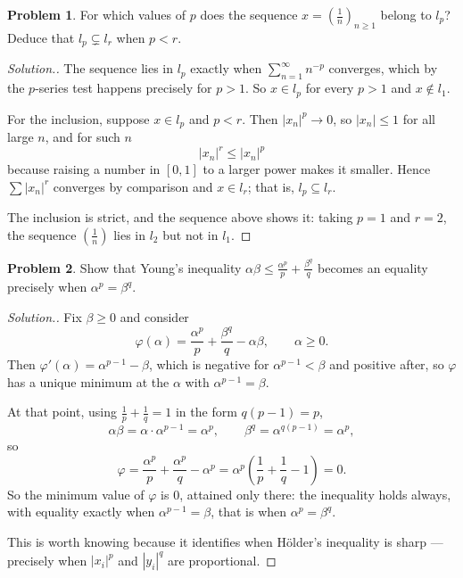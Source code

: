 \documentclass[11pt,a4paper]{article}
\theoremstyle{definition}
\newtheorem{problemx}{Problem}[section]
\newenvironment{problem}{\begin{problemx}}{\end{problemx}}
\newenvironment{solution}
  {\renewcommand{\qedsymbol}{}\begin{proof}[\textit{Solution}.]}
  {\end{proof}}
\begin{document}
\begin{problem}
For which values of $p$ does the sequence $x=\left(\frac{1}{n}\right)_{n\geq 1}$
belong to $l_p$? Deduce that $l_p\subsetneq l_r$ when $p<r$.
\end{problem}
\begin{solution}
The sequence lies in $l_p$ exactly when $\sum_{n=1}^{\infty}n^{-p}$ converges,
which by the $p$-series test happens precisely for $p>1$. So
$x\in l_p$ for every $p>1$ and $x\notin l_1$.

For the inclusion, suppose $x\in l_p$ and $p<r$. Then $|x_n|^p\rightarrow 0$, so
$|x_n|\leq 1$ for all large $n$, and for such $n$
$$|x_n|^r\leq |x_n|^p$$
because raising a number in $[0,1]$ to a larger power makes it smaller. Hence
$\sum|x_n|^r$ converges by comparison and $x\in l_r$; that is,
$l_p\subseteq l_r$.

The inclusion is strict, and the sequence above shows it: taking $p=1$ and
$r=2$, the sequence $\left(\frac1n\right)$ lies in $l_2$ but not in $l_1$.
\end{solution}

\begin{problem}
Show that Young's inequality $\alpha\beta\leq\frac{\alpha^p}{p}+\frac{\beta^q}{q}$
becomes an equality precisely when $\alpha^p=\beta^q$.
\end{problem}
\begin{solution}
Fix $\beta\geq 0$ and consider
$$\varphi(\alpha)=\frac{\alpha^p}{p}+\frac{\beta^q}{q}-\alpha\beta ,\qquad
\alpha\geq 0 .$$
Then $\varphi'(\alpha)=\alpha^{p-1}-\beta$, which is negative for
$\alpha^{p-1}<\beta$ and positive after, so $\varphi$ has a unique minimum at
the $\alpha$ with $\alpha^{p-1}=\beta$.

At that point, using $\frac1p+\frac1q=1$ in the form $q(p-1)=p$,
$$\alpha\beta=\alpha\cdot\alpha^{p-1}=\alpha^{p},\qquad
\beta^q=\alpha^{q(p-1)}=\alpha^{p},$$
so
$$\varphi=\frac{\alpha^p}{p}+\frac{\alpha^p}{q}-\alpha^p
=\alpha^p\left(\frac1p+\frac1q-1\right)=0 .$$
So the minimum value of $\varphi$ is $0$, attained only there: the inequality
holds always, with equality exactly when $\alpha^{p-1}=\beta$, that is when
$\alpha^p=\beta^q$.

This is worth knowing because it identifies when H\"older's inequality is sharp
--- precisely when $|x_i|^p$ and $|y_i|^q$ are proportional.
\end{solution}
\end{document}
